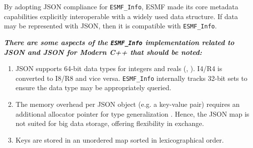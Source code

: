 By adopting JSON compliance for \texttt{ESMF\_Info}, ESMF made its core metadata capabilities explicitly interoperable with a widely used data structure. If data may be represented with JSON, then it is compatible with \texttt{ESMF\_Info}.

\textbf{\textit{There are some aspects of the \texttt{ESMF\_Info} implementation related to JSON and \textit{JSON for Modern C++} that should be noted:}}
\begin{enumerate}
    \item JSON supports 64-bit data types for integers and reals (\cite{json_for_modern_cpp_64bit_int}, \cite{json_for_modern_cpp_64bit_float}). I4/R4 is converted to I8/R8 and vice versa. \texttt{ESMF\_Info} internally tracks 32-bit sets to ensure the data type may be appropriately queried.
    \item The memory overhead per JSON object (e.g. a key-value pair) requires an additional allocator pointer for type generalization \cite{json_for_modern_cpp_memory_overhead}. Hence, the JSON map is not suited for big data storage, offering flexibility in exchange.
    \item Keys are stored in an unordered map sorted in lexicographical order.
\end{enumerate}

